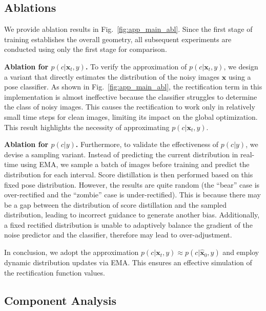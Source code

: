 \subsection{Ablations}\label{app:main_exps_abl}



We provide ablation results in Fig.~\ref{fig:app_main_abl}. Since the first stage of training establishes the overall geometry, all subsequent experiments are conducted using only the first stage for comparison.

\textbf{Ablation for $p(c|\boldsymbol{x}_t, y)$.} To verify the approximation of $p(c|\boldsymbol{x}_t, y)$, we design a variant that directly estimates the distribution of the noisy images $\boldsymbol{x}$ using a pose classifier. As shown in Fig.~\ref{fig:app_main_abl}, the rectification term in this implementation is almost ineffective because the classifier struggles to determine the class of noisy images. This causes the rectification to work only in relatively small time steps for clean images, limiting its impact on the global optimization. This result highlights the necessity of approximating $p(c|\boldsymbol{x}_t, y)$.

\textbf{Ablation for $p(c|y)$.} Furthermore, to validate the effectiveness of $p(c|y)$, we devise a sampling variant. Instead of predicting the current distribution in real-time using EMA, we sample a batch of images before training and predict the distribution for each interval. Score distillation is then performed based on this fixed pose distribution. However, the results are quite random (the ``bear'' case is over-rectified and the ``zombie'' case is under-rectified). This is because there may be a gap between the distribution of score distillation and the sampled distribution, leading to incorrect guidance to generate another bias. Additionally, a fixed rectified distribution is unable to adaptively balance the gradient of the noise predictor and the classifier, therefore may lead to over-adjustment.

In conclusion, we adopt the approximation $p(c|\boldsymbol{x}_t, y) \approx p(c|\hat{\boldsymbol{x}}_0, y)$ and employ dynamic distribution updates via EMA. This ensures an effective simulation of the rectification function values.












\subsection{Component Analysis}

